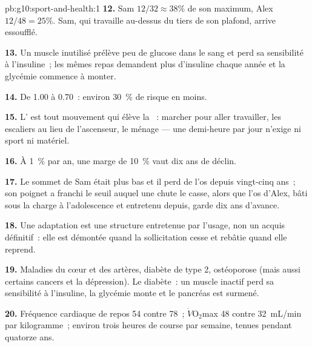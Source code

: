 \begin{solution}{pb:g10:sport-and-health:1}
\textbf{12.} Sam $12/32 \approx 38\%$ de son maximum, Alex $12/48 =
25\%$. Sam, qui travaille au-dessus du tiers de son plafond, arrive
essoufflé.

\textbf{13.} Un muscle inutilisé prélève peu de glucose dans le sang et
perd sa sensibilité à l'insuline~; les mêmes repas demandent plus
d'insuline chaque année et la glycémie commence à monter.

\textbf{14.} De 1.00 à 0.70~: environ 30~\% de risque en moins.

\textbf{15.} L' est tout mouvement qui élève la
~: marcher pour aller travailler, les escaliers au
lieu de l'ascenseur, le ménage --- une demi-heure par jour n'exige ni
sport ni matériel.

\textbf{16.} À 1~\% par an, une marge de 10~\% vaut dix ans de déclin.

\textbf{17.} Le sommet de Sam était plus bas et il perd de l'os depuis
vingt-cinq ans~; son poignet a franchi le seuil auquel une chute le
casse, alors que l'os d'Alex, bâti sous la charge à l'adolescence et
entretenu depuis, garde dix ans d'avance.

\textbf{18.} Une adaptation est une structure entretenue par l'usage,
non un acquis définitif~: elle est démontée quand la sollicitation
cesse et rebâtie quand elle reprend.

\textbf{19.} Maladies du cœur et des artères, diabète de type 2,
ostéoporose (mais aussi certains cancers et la dépression). Le
diabète~: un muscle inactif perd sa sensibilité à l'insuline, la
glycémie monte et le pancréas est surmené.

\textbf{20.} Fréquence cardiaque de repos 54 contre 78~;
$\dot V\!\mathrm{O_2}$max \num{48} contre \qty{32}{mL/min} par
kilogramme~; environ trois heures de course par semaine, tenues pendant
quatorze ans.
\end{solution}
